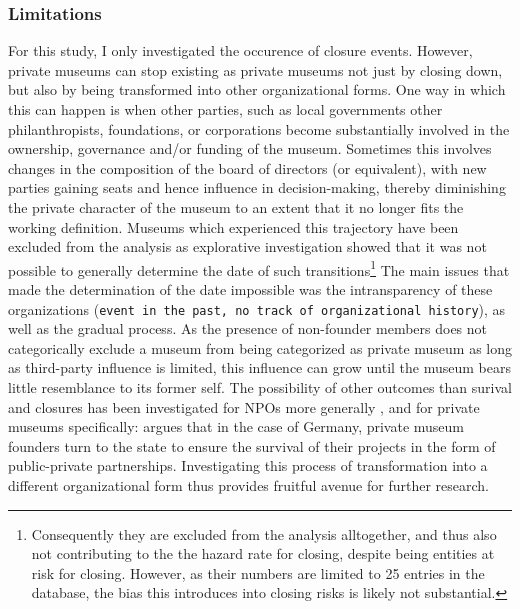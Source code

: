 \documentclass[12pt]{article}
\begin{document}
\begin{sloppypar}
\printbibliography
\end{sloppypar}
\subsubsection*{Limitations}




For this study, I only investigated the occurence of closure events.
However, private museums can stop existing as private museums not just by closing down, but also by being transformed into other organizational forms.
One way in which this can happen is when other parties, such as local governments other philanthropists, foundations, or corporations become substantially involved in the ownership, governance and/or funding of the museum.
Sometimes this involves changes in the composition of the board of directors (or equivalent), with new parties gaining seats and hence influence in decision-making, thereby diminishing the private character of the museum to an extent that it no longer fits the working definition.
Museums which experienced this trajectory have been excluded from the analysis as explorative investigation showed that it was not possible to generally determine the date of such transitions\footnote{Consequently they are excluded from the analysis alltogether, and thus also not contributing to the the hazard rate for closing, despite being entities at risk for closing. However, as their numbers are limited to 25 entries in the database, the bias this introduces into closing risks is likely not substantial.}
The main issues that made the determination of the date impossible was the intransparency of these organizations (\texttt{event in the past, no track of organizational history}), as well as the gradual process.
As the presence of non-founder members does not categorically exclude a museum from being categorized as private museum as long as third-party influence is limited, this influence can grow until the museum bears little resemblance to its former self.
The possibility of other outcomes than surival and closures has been investigated for NPOs more generally
\parencite{Searing_2020_zombies,HernandezOrtiz_2022_discontinuity,Helmig_Ingerfurth_Pinz_2013_nonprofit}, and for private museums specifically: 
\textcite{Walker_2019_collector} argues that in the case of Germany, private museum founders turn to the state to ensure the survival of their projects in the form of public-private partnerships.
Investigating this process of transformation into a different organizational form thus provides fruitful avenue for further research. 
\end{document}
